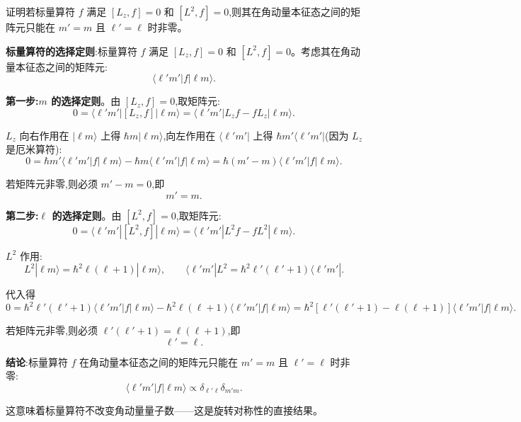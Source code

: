 \begin{question}
证明若标量算符 $f$ 满足 $[L_z,f]=0$ 和 $[L^2,f]=0$,则其在角动量本征态之间的矩阵元只能在 $m'=m$ 且 $\ell'=\ell$ 时非零。
\end{question}
\begin{solution}
	\textbf{标量算符的选择定则}:标量算符 $f$ 满足 $[L_z,f]=0$ 和 $[L^2,f]=0$。考虑其在角动量本征态之间的矩阵元:
	\[
	\langle \ell'm'|f|\ell m\rangle.
	\]

	\textbf{第一步:$m$ 的选择定则}。由 $[L_z,f]=0$,取矩阵元:
	\[
	0 = \langle \ell'm'|[L_z,f]|\ell m\rangle
	= \langle \ell'm'|L_z f - f L_z|\ell m\rangle.
	\]

	$L_z$ 向右作用在 $|\ell m\rangle$ 上得 $\hbar m|\ell m\rangle$,向左作用在 $\langle\ell'm'|$ 上得 $\hbar m'\langle\ell'm'|$(因为 $L_z$ 是厄米算符):
	\[
	0 = \hbar m'\langle\ell'm'|f|\ell m\rangle - \hbar m\langle\ell'm'|f|\ell m\rangle
	= \hbar(m'-m)\langle\ell'm'|f|\ell m\rangle.
	\]

	若矩阵元非零,则必须 $m'-m=0$,即
	\[
	\boxed{m' = m}.
	\]

	\textbf{第二步:$\ell$ 的选择定则}。由 $[L^2,f]=0$,取矩阵元:
	\[
	0 = \langle \ell'm'|[L^2,f]|\ell m\rangle
	= \langle\ell'm'|L^2 f - f L^2|\ell m\rangle.
	\]

	$L^2$ 作用:
	\[
	L^2|\ell m\rangle = \hbar^2\ell(\ell+1)|\ell m\rangle,
	\qquad
	\langle\ell'm'|L^2 = \hbar^2\ell'(\ell'+1)\langle\ell'm'|.
	\]

	代入得
	\[
	0 = \hbar^2\ell'(\ell'+1)\langle\ell'm'|f|\ell m\rangle
	- \hbar^2\ell(\ell+1)\langle\ell'm'|f|\ell m\rangle
	= \hbar^2[\ell'(\ell'+1)-\ell(\ell+1)]\langle\ell'm'|f|\ell m\rangle.
	\]

	若矩阵元非零,则必须 $\ell'(\ell'+1)=\ell(\ell+1)$,即
	\[
	\boxed{\ell' = \ell}.
	\]

	\textbf{结论}:标量算符 $f$ 在角动量本征态之间的矩阵元只能在 $m'=m$ 且 $\ell'=\ell$ 时非零:
	\[
	\boxed{\langle \ell'm'|f|\ell m\rangle \propto \delta_{\ell'\ell}\delta_{m'm}}.
	\]

	这意味着标量算符不改变角动量量子数——这是旋转对称性的直接结果。
	\end{solution}

